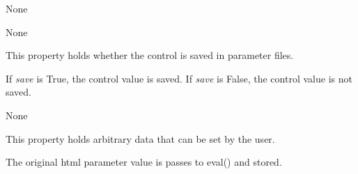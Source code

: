 \documentclass[letterpaper,10pt,english]{sphinxmanual}
\begin{document}
\begin{fulllineitems}
\begin{fulllineitems}
\label{api:controls.MessageDialog.message}
None

\end{fulllineitems}


\begin{fulllineitems}
\label{api:controls.MessageDialog.open}
None

\end{fulllineitems}


\begin{fulllineitems}
\label{api:controls.MessageDialog.save}
This property holds whether the control is saved in parameter files.

If \emph{save} is True, the control value is saved.
If \emph{save} is False, the control value is not saved.

\end{fulllineitems}


\begin{fulllineitems}
\label{api:controls.MessageDialog.severity}
None

\end{fulllineitems}


\begin{fulllineitems}
\label{api:controls.MessageDialog.user}
This property holds arbitrary data that can be set by the user.

The original html parameter value is passes to eval() and stored.

\end{fulllineitems}


\end{fulllineitems}

\end{document}
